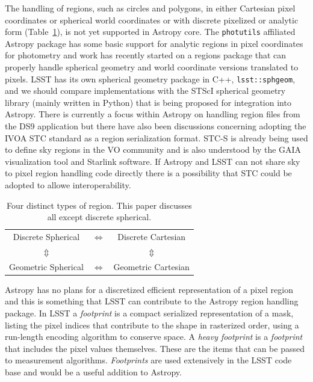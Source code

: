 \documentclass[]{spie}  %
\begin{document}
The handling of regions, such as circles and polygons, in either Cartesian pixel coordinates or spherical world coordinates or with discrete pixelized or analytic form (Table~\ref{tab:regions}), is not yet supported in Astropy core.
The \texttt{photutils} affiliated Astropy package has some basic support for analytic regions in pixel coordinates for photometry and work has recently started on a regions package that can properly handle spherical geometry and world coordinate versions translated to pixels.
LSST has its own spherical geometry package in C++, \texttt{lsst::sphgeom}, and we should compare implementations with the STScI spherical geometry library (mainly written in Python) that is being proposed for integration into Astropy.
There is currently a focus within Astropy on handling region files from the DS9 application\cite{2005ASPC..347..110J} but there have also been discussions concerning adopting the IVOA STC standard\cite{2007ivoa.spec.1030R} as a region serialization format.
STC-S is already being used to define sky regions in the VO community and is also understood by the GAIA visualization tool\cite{2009ASPC..411..575D} and Starlink software\cite{2010ASPC..434..213B,2014ASPC..485..391C}.
If Astropy and LSST can not share sky to pixel region handling code directly there is a possibility that STC could be adopted to allowe interoperability.

\begin{table}[t]
\centering
\caption{Four distinct types of region. This paper discusses all except discrete spherical.}
\label{tab:regions}
\vspace{10pt}
\begin{tabular}{ccc}
  Discrete Spherical & $\Longleftrightarrow$ & Discrete Cartesian \\
  $\Updownarrow$ & &  $\Updownarrow$ \\
  Geometric Spherical & $\Longleftrightarrow$ & Geometric Cartesian \\
\end{tabular}
\end{table}

Astropy has no plans for a discretized efficient representation of a pixel region and this is something that LSST can contribute to the Astropy region handling package.
In LSST a \emph{footprint} is a compact serialized representation of a mask, listing the pixel indices that contribute to the shape in rasterized order, using a run-length encoding algorithm to conserve space.
A \emph{heavy footprint} is a \emph{footprint} that includes the pixel values themselves.
These are the items that can be passed to measurement algorithms.
\emph{Footprints} are used extensively in the LSST code base and would be a useful addition to Astropy.
\end{document}
